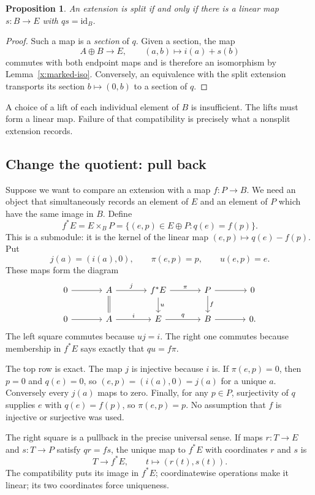 \documentclass[11pt]{article}
\newtheorem{proposition}[theorem]{Proposition}
\theoremstyle{definition}
\theoremstyle{remark}\newtheorem{remark}[theorem]{Remark}
\newcommand{\id}{\mathrm{id}}
\begin{document}
\begin{proposition}\label{x:splitting}
An extension is split if and only if there is a linear map $s:B\to E$
with $qs=\id_B$.
\end{proposition}
\begin{proof}
Such a map is a \emph{section} of $q$. Given a section, the map
\[
A\oplus B\longrightarrow E,\qquad (a,b)\longmapsto i(a)+s(b)
\]
commutes with both endpoint maps and is therefore an isomorphism by
Lemma~\ref{x:marked-iso}. Conversely, an equivalence with the split
extension transports its section $b\mapsto(0,b)$ to a section of $q$.
\end{proof}

A choice of a lift of each individual element of $B$ is insufficient.
The lifts must form a linear map. Failure of that compatibility is
precisely what a nonsplit extension records.

\subsection{Change the quotient: pull back}

Suppose we want to compare an extension with a map $f:P\to B$. We need
an object that simultaneously records an element of $E$ and an element
of $P$ which have the same image in $B$. Define
\[
f^*E=E\times_B P
 =\{(e,p)\in E\oplus P:q(e)=f(p)\}.
\]
This is a submodule: it is the kernel of the linear map
$(e,p)\mapsto q(e)-f(p)$. Put
\[
j(a)=(i(a),0),\qquad \pi(e,p)=p,\qquad u(e,p)=e.
\]
These maps form the diagram
\[
\begin{tikzcd}[column sep=large]
0\arrow[r]&A\arrow[r,"j"]\arrow[d,equal]
 &f^*E\arrow[r,"\pi"]\arrow[d,"u"]&P\arrow[r]\arrow[d,"f"]&0\\
0\arrow[r]&A\arrow[r,"i"]&E\arrow[r,"q"]&B\arrow[r]&0.
\end{tikzcd}
\]
The left square commutes because $uj=i$. The right one commutes because
membership in $f^*E$ says exactly that $qu=f\pi$.

The top row is exact. The map $j$ is injective because $i$ is. If
$\pi(e,p)=0$, then $p=0$ and $q(e)=0$, so $(e,p)=(i(a),0)=j(a)$
for a unique $a$. Conversely every $j(a)$ maps to zero. Finally, for
any $p\in P$, surjectivity of $q$ supplies $e$ with $q(e)=f(p)$, so
$\pi(e,p)=p$. No assumption that $f$ is injective or surjective was used.

The right square is a pullback in the precise universal sense. If maps
$r:T\to E$ and $s:T\to P$ satisfy $qr=fs$, the unique map to $f^*E$
with coordinates $r$ and $s$ is
\[
T\longrightarrow f^*E,\qquad t\longmapsto(r(t),s(t)).
\]
The compatibility puts its image in $f^*E$; coordinatewise operations
make it linear; its two coordinates force uniqueness.
\end{document}
